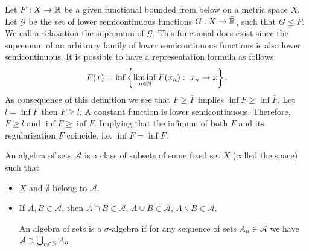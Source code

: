 \begin{definition}
	Let $F:X\rightarrow \bar{\mathbb{R}}$ be a given functional bounded from below on a metric space $X$.  Let $\mathcal G$ be the set of lower semicontinuous functions $G: X\rightarrow \bar{\mathbb{R}}$, such that $G\leq F$. We call a relaxation the supremum of $\mathcal G$.  This functional does exist since the supremum of an arbitrary family of lower semicontinuous functions is also lower semicontinuous. It is possible to have a representation formula as follows:
	\begin{equation}
	\bar F(x) = \inf \left\lbrace \liminf_{n\in \mathbb{N}} F(x_n):\ x_n\rightarrow x \right\rbrace.
	\end{equation}
	As consequence of this definition we see that $F \geq \bar F$ implies $\inf F \geq \inf \bar F$. Let $l=\inf F$ then $F\geq l$. A constant function is lower semicontinuous. Therefore, $\bar F \geq l$ and $\inf \bar F \geq \inf F$. Implying that the infimum of both $F$ and its regularization $\bar F$ coincide, i.e. $\inf \bar F = \inf F$. 
\end{definition}




\begin{definition}
An algebra of sets $\mathcal{A}$ is a class of subsets of some fixed set $X$ (called the space) such that

\begin{itemize}
	\item $X$ and $\emptyset$ belong to $\mathcal{A}$.
	\item If $A, B \in \mathcal{A}$, then $A\cap B \in \mathcal{A}$, $A\cup B \in \mathcal A$, $A\backslash B \in \mathcal A$.

An algebra of sets is a $\sigma$-algebra if for any sequence of sets $A_n \in \mathcal A$ we have $\mathcal{A}\ni \bigcup_{n\in \mathbb{N}}  A_n $.
\end{itemize}
\end{definition}
\begin{definition}
\end{definition}

\begin{definition}

\end{definition}


